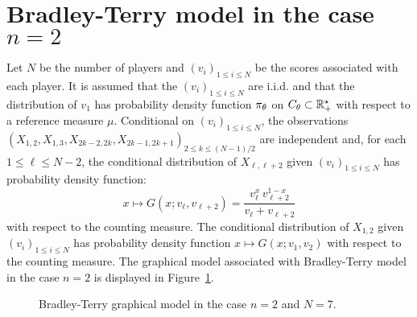 \section*{Bradley-Terry model in the case $n=2$}
Let $N$ be the number of players and $(v_i)_{1\le i\le N}$ be the scores associated with each player. It is assumed that the $(v_i)_{1\le i\le N}$ are i.i.d. and that the distribution of $v_1$ has probability density function $\pi_{\theta}$ on $C_{\theta}\subset \mathbb{R}_+^{\star}$ with respect to a reference measure $\mu$. Conditional on $(v_i)_{1 \le i \le N}$, the observations $(X_{1,2},X_{1,3}, X_{2k-2,2k}, X_{2k-1,2k+1})_{2\le k \le (N-1)/2}$ are independent and, for each $1\le \ell\le N-2$, the conditional distribution of $X_{\ell,\ell+2}$ given $(v_i)_{1\le i\le N}$ has probability density function:
\begin{equation}
\label{eq:defG}
x\mapsto G (x;v_{\ell},v_{\ell+2}) = \frac{v_{\ell}^x\,v_{\ell+2}^{1-x}}{v_{\ell} + v_{\ell+2}}
\end{equation}
with respect to the counting measure. The conditional distribution of $X_{1,2}$ given $(v_i)_{1\le i\le N}$ has probability density function $x\mapsto G (x;v_{1},v_{2})$ with respect to the counting measure.
The graphical model associated with Bradley-Terry model in the case $n=2$ is displayed in Figure~\ref{fig:bt}.
\begin{figure}[h!]
\centering
{}
\caption{Bradley-Terry graphical model in the case $n=2$ and $N=7$.}
\label{fig:bt}
\end{figure}


